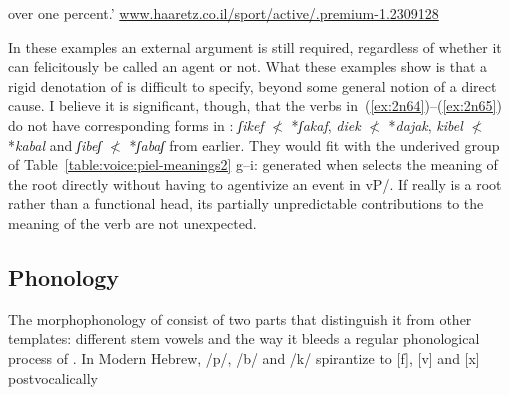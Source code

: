 \begin{exe}
\begin{xlist}
\begin{exe}
\begin{xlist}
\begin{exe}
\begin{xlist}
\begin{exe}
\begin{exe}
\begin{xlist}
\begin{exe}
\begin{xlist}
\begin{exe}
\begin{xlist}
\begin{exe}
\begin{xlist}
\begin{exe}
\begin{xlist}
\begin{exe}
\begin{xlist}
\begin{exe}
\begin{xlist}
\begin{exe}
\begin{xlist}
\begin{exe}
\begin{xlist}
\begin{exe}
\begin{xlist}
\begin{exe}
\begin{xlist}
\begin{exe}
\begin{xlist}
\begin{exe}
\begin{exe}
\begin{xlist}
\begin{exe}
\begin{xlist}
\begin{exe}
\begin{xlist}
\begin{exe}
\begin{xlist}
{\begin{exe}
\begin{xlist}
\begin{exe}
\begin{xlist}
\begin{exe}
\begin{xlist}
\begin{exe}
\begin{xlist}
\begin{xlist}
\begin{xlist}
\begin{exe}
\begin{xlist}
\begin{xlist}
\begin{xlist}
\begin{exe}
\begin{exe}
\begin{xlist}
\begin{exe}
\begin{xlist}
\begin{exe}
\begin{xlist}
\begin{exe}
\begin{xlist}
\begin{exe}
\begin{xlist}
\begin{exe}
\begin{xlist}
\begin{exe}
\begin{exe}
\begin{xlist}
\begin{xlist}
\begin{exe}
\begin{xlist}
\begin{exe}
\begin{xlist}
\begin{exe}
\begin{xlist}
\begin{exe}
\begin{xlist}
\begin{exe}
\begin{xlist}
\begin{exe}
\begin{xlist}
\begin{exe}
\begin{exe}
\begin{xlist}
\begin{exe}
\begin{xlist}
\begin{exe}
\begin{xlist}
\begin{exe}
\begin{xlist}
\begin{exe}
\begin{xlist}
\begin{exe}
\begin{xlist}
\begin{exe}
\begin{xlist}
{over one percent.' \hfill \url{www.haaretz.co.il/sport/active/.premium-1.2309128} } 
  
 \z
{} \label{ex:2n65}
  
 \z 

In these examples an external argument is still required, regardless of whether it can felicitously be called an agent or not. What these examples show is that a rigid denotation of {\va} is difficult to specify, beyond some general notion of a direct cause. I believe it is significant, though, that the verbs in~(\ref{ex:2n64})--(\ref{ex:2n65}) do not have corresponding forms in {\tkal}: \emph{ʃikef} $\nless$ *\emph{ʃakaf}, \emph{diek} $\nless$ *\emph{dajak}, \emph{kibel} $\nless$ *\emph{kabal} and \emph{ʃibeʃ} $\nless$ *\emph{ʃabaʃ} from earlier. They would fit with the underived group of Table~\ref{table:voice:piel-meanings2} g--i: generated when {\va} selects the meaning of the root directly without having to agentivize an event in vP/{\tkal}. If {\va} really is a root rather than a functional head, its partially unpredictable contributions to the meaning of the verb are not unexpected.

	\subsection{Phonology} \label{voice:va:phono}
The morphophonology of {\tpie} consist of two parts that distinguish it from other templates: different stem vowels and the way it bleeds a regular phonological process of . In Modern Hebrew, /p/, /b/ and /k/ spirantize to [f], [v] and [x] postvocalically 
\end{xlist}
\end{exe}
\end{xlist}
\end{exe}
\end{xlist}
\end{exe}
\end{xlist}
\end{exe}
\end{xlist}
\end{exe}
\end{xlist}
\end{exe}
\end{xlist}
\end{exe}
\end{exe}
\end{xlist}
\end{exe}
\end{xlist}
\end{exe}
\end{xlist}
\end{exe}
\end{xlist}
\end{exe}
\end{xlist}
\end{exe}
\end{xlist}
\end{exe}
\end{xlist}
\end{xlist}
\end{exe}
\end{exe}
\end{xlist}
\end{exe}
\end{xlist}
\end{exe}
\end{xlist}
\end{exe}
\end{xlist}
\end{exe}
\end{xlist}
\end{exe}
\end{xlist}
\end{exe}
\end{exe}
\end{xlist}
\end{xlist}
\end{xlist}
\end{exe}
\end{xlist}
\end{xlist}
\end{xlist}
\end{exe}
\end{xlist}
\end{exe}
\end{xlist}
\end{exe}
\end{xlist}
\end{exe}}
\end{xlist}
\end{exe}
\end{xlist}
\end{exe}
\end{xlist}
\end{exe}
\end{xlist}
\end{exe}
\end{exe}
\end{xlist}
\end{exe}
\end{xlist}
\end{exe}
\end{xlist}
\end{exe}
\end{xlist}
\end{exe}
\end{xlist}
\end{exe}
\end{xlist}
\end{exe}
\end{xlist}
\end{exe}
\end{xlist}
\end{exe}
\end{xlist}
\end{exe}
\end{xlist}
\end{exe}
\end{xlist}
\end{exe}
\end{xlist}
\end{exe}
\end{exe}
\end{xlist}
\end{exe}
\end{xlist}
\end{exe}
\end{xlist}
\end{exe}
